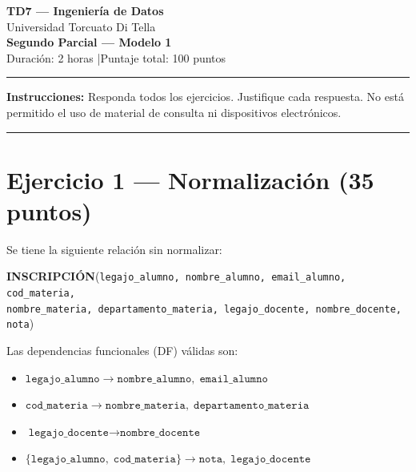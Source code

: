 \documentclass[11pt,a4paper]{article}
\begin{document}
\begin{center}
  {\LARGE\bfseries TD7 — Ingeniería de Datos}\\[6pt]
  {\large Universidad Torcuato Di Tella}\\[4pt]
  {\Large\bfseries Segundo Parcial — Modelo 1}\\[4pt]
  {\normalsize Duración: 2 horas \quad|\quad Puntaje total: 100 puntos}
\end{center}
\noindent\rule{\linewidth}{0.8pt}
\vspace{2pt}

\noindent\textbf{Instrucciones:} Responda todos los ejercicios. Justifique cada respuesta. No está permitido el uso de material de consulta ni dispositivos electrónicos.

\vspace{6pt}
\noindent\rule{\linewidth}{0.4pt}

\section*{Ejercicio 1 — Normalización \hfill\normalfont(35 puntos)}

Se tiene la siguiente relación sin normalizar:

\begin{center}
\textbf{INSCRIPCIÓN}(\texttt{legajo\_alumno, nombre\_alumno, email\_alumno, cod\_materia,}\\
\texttt{nombre\_materia, departamento\_materia, legajo\_docente, nombre\_docente, nota})
\end{center}

Las dependencias funcionales (DF) válidas son:

\begin{itemize}
  \item $\texttt{legajo\_alumno} \rightarrow \texttt{nombre\_alumno},\; \texttt{email\_alumno}$
  \item $\texttt{cod\_materia} \rightarrow \texttt{nombre\_materia},\; \texttt{departamento\_materia}$
  \item $\texttt{legajo\_docente} \rightarrow \texttt{nombre\_docente}$
  \item $\{\texttt{legajo\_alumno},\; \texttt{cod\_materia}\} \rightarrow \texttt{nota},\; \texttt{legajo\_docente}$
\end{itemize}
\end{document}
